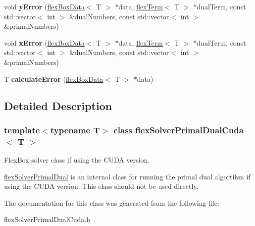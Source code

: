\begin{DoxyCompactItemize}
\mbox{\label{classflex_solver_primal_dual_cuda_a983fcb3ec45e57491a6be6179ba23a90}} 
void {\bfseries y\+Error} (\hyperlink{classflex_box_data}{flex\+Box\+Data}$<$ T $>$ $\ast$data, \hyperlink{classflex_term}{flex\+Term}$<$ T $>$ $\ast$dual\+Term, const std\+::vector$<$ int $>$ \&dual\+Numbers, const std\+::vector$<$ int $>$ \&primal\+Numbers)
\item 
\mbox{\label{classflex_solver_primal_dual_cuda_a52e5086520e5590b1d26deabb989b39b}} 
void {\bfseries x\+Error} (\hyperlink{classflex_box_data}{flex\+Box\+Data}$<$ T $>$ $\ast$data, \hyperlink{classflex_term}{flex\+Term}$<$ T $>$ $\ast$dual\+Term, const std\+::vector$<$ int $>$ \&dual\+Numbers, const std\+::vector$<$ int $>$ \&primal\+Numbers)
\item 
\mbox{\label{classflex_solver_primal_dual_cuda_a8d08313435dad5b2fd832570fdf42263}} 
T {\bfseries calculate\+Error} (\hyperlink{classflex_box_data}{flex\+Box\+Data}$<$ T $>$ $\ast$data)
\end{DoxyCompactItemize}


\subsection{Detailed Description}
\subsubsection*{template$<$typename T$>$\newline
class flex\+Solver\+Primal\+Dual\+Cuda$<$ T $>$}

Flex\+Box solver class if using the C\+U\+DA version. 

\hyperlink{classflex_solver_primal_dual}{flex\+Solver\+Primal\+Dual} is an internal class for running the primal dual algortihm if using the C\+U\+DA version. This class should not be used directly. 

The documentation for this class was generated from the following file\+:\begin{DoxyCompactItemize}
\item 
flex\+Solver\+Primal\+Dual\+Cuda.\+h\end{DoxyCompactItemize}
